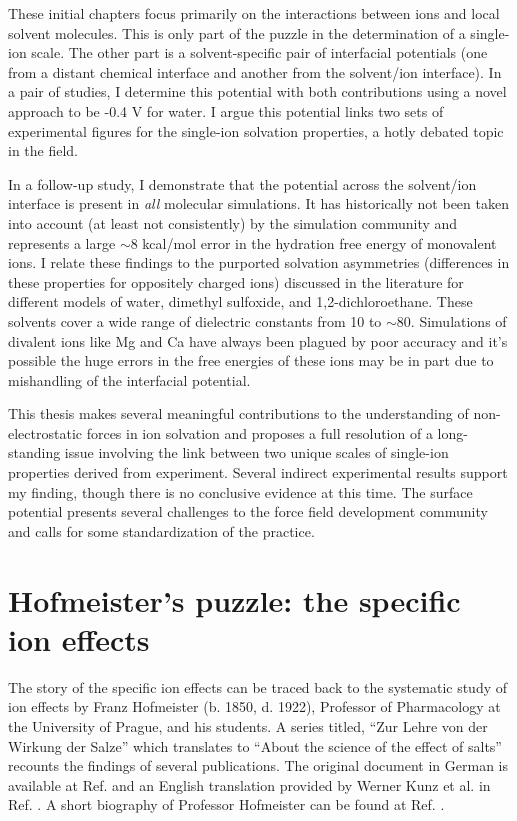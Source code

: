 \begin{intro}
   These initial chapters focus primarily on the interactions between ions and local solvent molecules. This is only part of the puzzle in the determination of a single-ion 
   scale. The other part is a solvent-specific pair of interfacial potentials (one from a distant chemical interface and another from the solvent/ion interface). In a pair 
   of studies, I determine this potential with both contributions using a novel approach to be -0.4 V for water. I argue this potential links two sets of experimental figures 
   for the single-ion solvation properties, a hotly debated topic in the field.
   
   In a follow-up study, I demonstrate that the potential across the solvent/ion interface is present in \emph{all} molecular simulations. It has historically not been taken 
   into account (at least not consistently) by the simulation community and represents a large $\sim$8 kcal/mol error in the hydration free energy of monovalent ions. I relate 
   these findings to the purported solvation asymmetries (differences in these properties for oppositely charged ions) discussed in the literature for different models of
   water, dimethyl sulfoxide, and 1,2-dichloroethane. These solvents cover a wide range of dielectric constants from 10 to $\sim$80. Simulations of divalent ions like
   Mg and Ca have always been plagued by poor accuracy and it's possible the huge errors in the free energies of these ions may be in part due to mishandling 
   of the interfacial potential.
   
   This thesis makes several meaningful contributions to the understanding of non-electrostatic forces in ion solvation and proposes a full resolution of a long-standing 
   issue involving the link between two unique scales of single-ion properties derived from experiment. Several indirect experimental results support my finding, though
   there is no conclusive evidence at this time. The surface potential presents several challenges to the force field development community and calls for some standardization 
   of the practice.
   
  \section{\label{ch1:sec1:level1}Hofmeister's puzzle: the specific ion effects}
   The story of the specific ion effects can be traced back to the systematic study of ion effects by Franz Hofmeister (b. 1850, d. 1922), Professor of Pharmacology at the 
   University of Prague, and his students. A series titled, ``Zur Lehre von der Wirkung der Salze'' which translates to ``About the science of the effect of salts'' recounts
   the findings of several publications. The original document in German is available at Ref. \cite{hofmeister1888lehre} and an English translation provided by Werner Kunz
   et al. in Ref. \cite{kunz2004translation}. A short biography of Professor Hofmeister can be found at Ref. \cite{abernethy1967franz}.
   

\end{intro}
